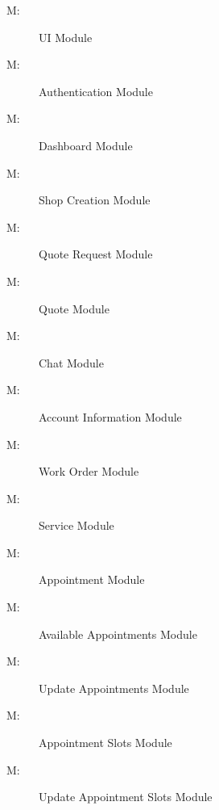 \documentclass[12pt, titlepage]{article}
\newcounter{mnum}
\newcommand{\mthemnum}{M\themnum}
\begin{document}
\begin{description}
\item [ \mthemnum \label{mUI}:] UI Module
\item [ \mthemnum \label{mAuth}:] Authentication Module
\item [ \mthemnum \label{mDashboard}:] Dashboard Module
\item [ \mthemnum \label{mShopCreation}:] Shop Creation Module
\item [ \mthemnum \label{mQuoteRequest}:] Quote Request Module
\item [ \mthemnum \label{mQuote}:] Quote Module
\item [ \mthemnum \label{mChat}:] Chat Module
\item [ \mthemnum \label{mAccountInfo}:] Account Information Module
\item [ \mthemnum \label{mWorkOrder}:] Work Order Module
\item [ \mthemnum \label{mService}:] Service Module
\item [ \mthemnum \label{mAppointment}:] Appointment Module
\item [ \mthemnum \label{mAvailableAppointments}:] Available Appointments Module
\item [ \mthemnum \label{mUpdateAppointments}:] Update Appointments Module
\item [ \mthemnum \label{mAppointmentSlots}:] Appointment Slots Module
\item [ \mthemnum \label{mUpdateAppointmentSlots}:] Update Appointment Slots Module
\end{description}
\end{document}
